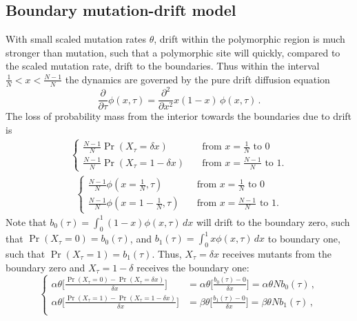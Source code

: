 \documentclass[preprint]{elsarticle}
\newcommand\x[1]{\ensuremath{X_{#1}}}
\begin{document}

\subsection{Boundary mutation-drift model}

With small scaled mutation rates $\theta$, drift within the polymorphic region is much stronger than mutation, such that a polymorphic site will quickly, compared to the scaled mutation rate, drift to the boundaries. Thus within the interval $\frac1N<x<\frac{N-1}N$ the dynamics are governed by the pure drift diffusion equation
\begin{equation}\label{eq:forw_drift}
  \frac{\partial}{\partial \tau} \phi(x,\tau) =\frac{\partial^2}{\partial x^2}x(1-x)\,\phi(x,\tau)\,.  
\end{equation}
The loss of probability mass from the interior towards the boundaries due to drift is 
\begin{align}\label{eq:forw_lossdrift}
  \begin{cases}
    \frac{N-1}N\Pr(\x{\tau}=\delta x)  \quad         & \text{from $x=\frac1N$ to 0}\\
    \frac{N-1}N\Pr(\x{\tau}=1-\delta x)  \quad         & \text{from $x=\frac{N-1}N$ to 1.}
\end{cases}
\end{align}
\begin{align}\label{eq:forw_lossdrift}
  \begin{cases}
    \frac{N-1}N\phi(x=\frac1N,\tau)  \quad         & \text{from $x=\frac1N$ to 0}\\
    \frac{N-1}N\phi(x=1-\frac1N,\tau)  \quad         & \text{from $x=\frac{N-1}N$ to 1.}
\end{cases}
\end{align}
Note that $b_0(\tau)=\int_0^1(1-x) \phi(x,\tau)\,dx$ will drift to the boundary zero, such that $\Pr(\x{\tau}=0)=b_0(\tau)$, and $b_1(\tau)=\int_0^1 x \phi(x,\tau)\,dx$ to boundary one, such that $\Pr(\x{\tau}=1)=b_1(\tau)$. Thus, $\x{\tau}=\delta x$ receives mutants from the boundary zero and  $\x{\tau}=1-\delta$ receives the boundary one:
\begin{equation}\label{eq:forw_gainmut}
\begin{cases}
\alpha\theta \bigg[\frac{\Pr(\x{\tau}=0) - \Pr(\x{\tau}=\delta x)}{\delta x}\bigg]&=\alpha\theta \bigg[\frac{b_0(\tau) - 0}{\delta x}\bigg]=\alpha\theta N b_0(\tau)\,,\\
\alpha\theta \bigg[\frac{\Pr(\x{\tau}=1) - \Pr(\x{\tau}=1-\delta x)}{\delta x}\bigg]&=\beta\theta \bigg[\frac{b_1(\tau) - 0}{\delta x}\bigg]=\beta\theta N b_1(\tau)\,,\\
\end{cases}
\end{equation}
\end{document}
